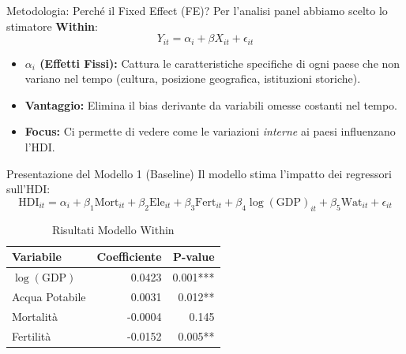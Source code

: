 \documentclass{beamer}
\begin{document}
\begin{frame}{Metodologia: Perché il Fixed Effect (FE)?}
    Per l'analisi panel abbiamo scelto lo stimatore \textbf{Within}:
    \begin{equation*}
        Y_{it} = \alpha_i + \beta X_{it} + \epsilon_{it}
    \end{equation*}
    \vspace{0.3cm}
    \begin{itemize}
        \item \textbf{$\alpha_i$ (Effetti Fissi):} Cattura le caratteristiche specifiche di ogni paese che non variano nel tempo (cultura, posizione geografica, istituzioni storiche).
        \item \textbf{Vantaggio:} Elimina il bias derivante da variabili omesse costanti nel tempo.
        \item \textbf{Focus:} Ci permette di vedere come le variazioni \textit{interne} ai paesi influenzano l'HDI.
    \end{itemize}
\end{frame}

\begin{frame}{Presentazione del Modello 1 (Baseline)}
    Il modello stima l'impatto dei regressori sull'HDI:
    \begin{equation*}
        \text{HDI}_{it} = \alpha_i + \beta_1 \text{Mort}_{it} + \beta_2 \text{Ele}_{it} + \beta_3 \text{Fert}_{it} + \beta_4 \log(\text{GDP})_{it} + \beta_5 \text{Wat}_{it} + \epsilon_{it}
    \end{equation*}
    
    \begin{table}
        \small
        \centering
        \begin{tabular}{lrr}
            \toprule
            \textbf{Variabile} & \textbf{Coefficiente} & \textbf{P-value} \\
            \midrule
            $\log(\text{GDP})$ & 0.0423 & 0.001*** \\
            Acqua Potabile & 0.0031 & 0.012** \\
            Mortalità & -0.0004 & 0.145 \\
            Fertilità & -0.0152 & 0.005** \\
            \bottomrule
        \end{tabular}
        \caption{Risultati Modello Within}
    \end{table}
\end{frame}
\end{document}
